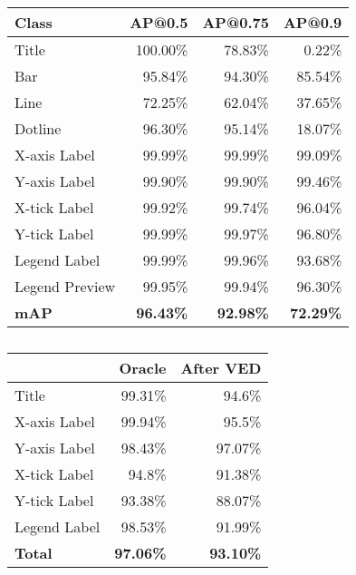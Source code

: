 \documentclass[10pt,twocolumn,letterpaper]{article}
\begin{document}
\begin{table}[t]
\footnotesize
\begin{center}
\begin{tabular}{|l|r|r|r|}
\hline 
\textbf{Class} & \textbf{AP@0.5} & \textbf{AP@0.75} & \textbf{AP@0.9} \\ \hline
Title & 100.00\% & 78.83\% & 0.22\% \\
Bar & 95.84\% & 94.30\% & 85.54\% \\
Line & 72.25\% & 62.04\% & 37.65\% \\
Dotline & 96.30\% & 95.14\% & 18.07\% \\
X-axis Label & 99.99\% & 99.99\% & 99.09\% \\
Y-axis Label & 99.90\% & 99.90\% & 99.46\% \\
X-tick Label & 99.92\% & 99.74\% & 96.04\% \\
Y-tick Label & 99.99\% & 99.97\% & 96.80\% \\
Legend Label & 99.99\% & 99.96\% & 93.68\% \\
Legend Preview & 99.95\% & 99.94\% & 96.30\% \\ \hline
\textbf{mAP} & \textbf{96.43\%} & \textbf{92.98\%} & \textbf{72.29\%}\\ \hline
\end{tabular}
\caption{}
\label{maskrcnn_ved}
\end{center}
\end{table}


\begin{table}[t]
\footnotesize
\begin{center}
\begin{tabular}{|l|r|r|}
\hline
& \textbf{Oracle} & \textbf{After VED}\\ \hline
Title & 99.31\% & 94.6\% \\
X-axis Label & 99.94\% & 95.5\% \\
Y-axis Label & 98.43\% & 97.07\% \\
X-tick Label & 94.8\% & 91.38\% \\
Y-tick Label & 93.38\% & 88.07\% \\
Legend Label & 98.53\% & 91.99\% \\
\hline
\textbf{Total} & \textbf{97.06\%} &\textbf{ 93.10\%} \\
\hline
\end{tabular}
\caption{}
\label{ocr-acc}
\end{center}
\end{table}
\end{document}
